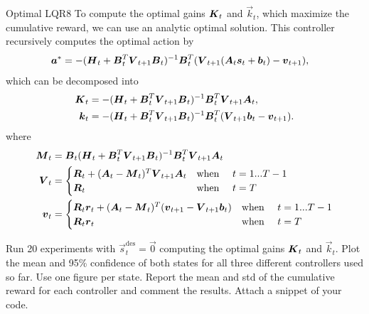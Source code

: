 \begin{questions}
	
	
\begin{question}{Optimal LQR}{8}
	To compute the optimal gains ${\boldsymbol{K}}_t$ and $\vec k_t$, which maximize the cumulative reward, we can use an analytic optimal solution. This controller recursively computes the optimal action by
	\begin{align}
		{\boldsymbol{a}}^* &= -({\boldsymbol{H}}_t + {\boldsymbol{B}}^T_t {\boldsymbol{V}}_{t+1}{\boldsymbol{B}}_t)^{-1}	{\boldsymbol{B}}^T_t ({\boldsymbol{V}}_{t+1} ({\boldsymbol{A}}_t {\boldsymbol{s}}_t+{\boldsymbol{b}}_t )- {\boldsymbol{v}}_{t+1} ),
	\end{align}
	which can be decomposed into
	\begin{align}
		{\boldsymbol{K}}_t &= -({\boldsymbol{H}}_t + {\boldsymbol{B}}^T_t {\boldsymbol{V}}_{t+1}{\boldsymbol{B}}_t)^{-1}	{\boldsymbol{B}}^T_t {\boldsymbol{V}}_{t+1} {\boldsymbol{A}}_t,
		\\
		{\boldsymbol{k}}_t &= -({\boldsymbol{H}}_t + {\boldsymbol{B}}^T_t {\boldsymbol{V}}_{t+1}{\boldsymbol{B}}_t)^{-1}	{\boldsymbol{B}}^T_t ({\boldsymbol{V}}_{t+1} {\boldsymbol{b}}_t - {\boldsymbol{v}}_{t+1}).
	\end{align}
	where
	\begin{align}
		{\boldsymbol{M}}_t &= {\boldsymbol{B}}_t({\boldsymbol{H}}_t + {\boldsymbol{B}}^T_t {\boldsymbol{V}}_{t+1}{\boldsymbol{B}}_t)^{-1}	{\boldsymbol{B}}^T_t {\boldsymbol{V}}_{t+1} {\boldsymbol{A}}_t
		\\
		{\boldsymbol{V}}_t &=
		\begin{cases}
	       {\boldsymbol{R}}_t + ({\boldsymbol{A}}_t - {\boldsymbol{M}}_t)^T{\boldsymbol{V}}_{t+1}{\boldsymbol{A}}_t & \text{when \quad} t = 1...T-1
	       \\
	       {\boldsymbol{R}}_t & \text{when \quad} t = T
	    \end{cases}
	    \\
		{\boldsymbol{v}}_t &= 
		\begin{cases}
	       {\boldsymbol{R}}_t{\boldsymbol{r}}_t + ({\boldsymbol{A}}_t - {\boldsymbol{M}}_t)^T({\boldsymbol{v}}_{t+1} - {\boldsymbol{V}}_{t+1}{\boldsymbol{b}}_t) & \text{when \quad} t = 1...T-1
	       \\
	       {\boldsymbol{R}}_t{\boldsymbol{r}}_t & \text{when \quad} t = T
	    \end{cases}
	\end{align}		 

	Run 20 experiments with $\vec s^\text{des}_t = \vec 0$ computing the optimal gains ${\boldsymbol{K}}_t$ and $\vec k_t$. Plot the mean and 95\% confidence of both states for all three different controllers used so far. Use one figure per state. 
	Report the mean and std of the cumulative reward for each controller and comment the results. Attach a snippet of your code.


\end{question}
\end{questions}
